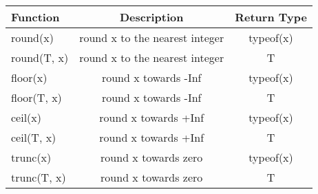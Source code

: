 \documentclass[
]{article}
\begin{document}
\begin{longtable}[]{@{}lcc@{}}
\toprule\noalign{}
Function & Description & Return Type \\
\midrule\noalign{}
\endhead
\bottomrule\noalign{}
\endlastfoot
round(x) & round x to the nearest integer & typeof(x) \\
round(T, x) & round x to the nearest integer & T \\
floor(x) & round x towards -Inf & typeof(x) \\
floor(T, x) & round x towards -Inf & T \\
ceil(x) & round x towards +Inf & typeof(x) \\
ceil(T, x) & round x towards +Inf & T \\
trunc(x) & round x towards zero & typeof(x) \\
trunc(T, x) & round x towards zero & T \\
\end{longtable}
\end{document}

